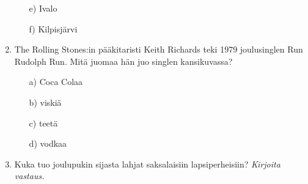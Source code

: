 \documentclass[a4paper,12pt,twoside]{article}
\begin{document}
\begin{enumerate}
\begin{itemize}
  \item[e)]{Ivalo}
  \item[f)]{Kilpisjärvi}
\end{itemize}
\item{The Rolling Stones:in pääkitaristi Keith Richards teki 1979 joulusinglen Run Rudolph Run. Mitä juomaa hän juo singlen kansikuvassa?}
\begin{itemize}
  \item[a)]{Coca Colaa}
  \item[b)]{viskiä}    
  \item[c)]{teetä}
  \item[d)]{vodkaa}
\end{itemize}
\item{Kuka tuo joulupukin sijasta lahjat saksalaisiin lapsiperheisiin?}
  \newline\emph{Kirjoita vastaus.}
\end{enumerate}
\end{document}
